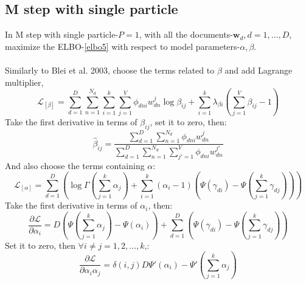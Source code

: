 \documentclass[a4paper]{article}
\newcommand{\bs}{\boldsymbol}
\newcommand{\Sum}{\displaystyle\sum}
\begin{document}
\subsection{M step with single particle}
In M step with single particle-$P=1$, with all the documents-$\bs{w}_d,d=1,\ldots,D$, maximize the  ELBO-\ref{elbo5} with respect to model parameters-$\alpha,\beta$.\\
\\
Similarly to Blei et al. 2003, choose the terms related to $\beta$ and add Lagrange multiplier,\\
\[
\mathcal{L}_{[\beta]}=\Sum_{d=1}^{D}\Sum_{n=1}^{N_d}\Sum_{i=1}^{k}\Sum_{j=1}^{V}\phi_{dni}w_{dn}^j\log\beta_{ij}+\Sum_{i=1}^{k}\lambda_{\beta i}(\Sum_{j=1}^{V}\beta_{ij}-1)
\]
Take the first derivative in terms of $\beta_{ij}$, set it to zero, then:\\
\[
\hat{\beta}_{ij}=\frac{\sum_{d=1}^{D}\sum_{n=1}^{N_d}\phi_{dni}w_{dn}^j}{\sum_{d=1}^{D}\sum_{n=1}^{N_d}\sum_{j'=1}^{V}\phi_{dni}w_{dn}^{j'}}
\]
And also choose the terms containing $\alpha$:\\
\[
\mathcal{L}_{[\alpha]}=\Sum_{d=1}^{D}\left(\log\Gamma(\sum_{j=1}^{k}\alpha_j)+\Sum_{i=1}^{k}(\alpha_i-1)(\Psi(\gamma_{di})-\Psi(\sum_{j=1}^{k}\gamma_{dj}))\right)
\]
Take the first derivative in terms of $\alpha_{i}$,  then:\\
\[
\frac{\partial \mathcal{L}}{\partial \alpha_{i} }=D(\Psi(\sum_{j=1}^{k}\alpha_j)-\Psi(\alpha_i))+\Sum_{d=1}^{D}(\Psi(\gamma_{di})-\Psi(\sum_{j=1}^{k}\gamma_{dj}))
\]
Set it to zero, then $\forall i\neq j=1,2,\ldots,k$,:\\
\[
\frac{\partial \mathcal{L}}{\partial \alpha_{i}\alpha_{j} }=\delta(i,j)D\Psi'(\alpha_i)-\Psi'(\sum_{j=1}^{k}\alpha_j)
\]
\end{document}
